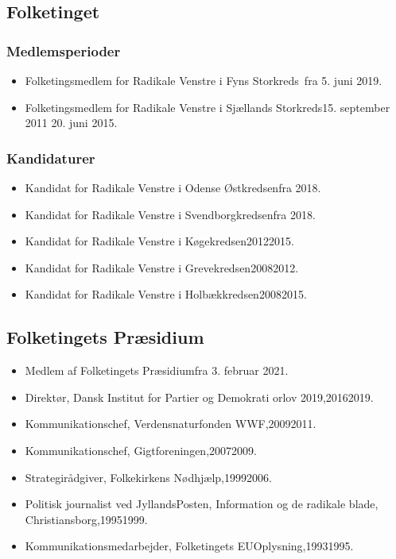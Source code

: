 \documentclass[11pt, a4paper]{awesome-cv}
\begin{document}
\begin{cvletter}
\subsection*{Folketinget}
\subsubsection*{Medlemsperioder}
\begin{itemize}
\item Folketingsmedlem for Radikale Venstre i Fyns Storkreds fra 5. juni 2019.
\item Folketingsmedlem for Radikale Venstre i Sjællands Storkreds15. september 2011  20. juni 2015.
\end{itemize}
\subsubsection*{Kandidaturer}
\begin{itemize}
\item Kandidat for Radikale Venstre i Odense Østkredsenfra 2018.
\item Kandidat for Radikale Venstre i Svendborgkredsenfra 2018.
\item Kandidat for Radikale Venstre i Køgekredsen20122015.
\item Kandidat for Radikale Venstre i Grevekredsen20082012.
\item Kandidat for Radikale Venstre i Holbækkredsen20082015.
\end{itemize}
\subsection*{Folketingets Præsidium}
\begin{itemize}
\item Medlem af Folketingets Præsidiumfra 3. februar 2021.
\end{itemize}
\begin{itemize}
\item Direktør, Dansk Institut for Partier og Demokrati orlov 2019,20162019.
\item Kommunikationschef, Verdensnaturfonden WWF,20092011.
\item Kommunikationschef, Gigtforeningen,20072009.
\item Strategirådgiver, Folkekirkens Nødhjælp,19992006.
\item Politisk journalist ved JyllandsPosten, Information og de radikale blade, Christiansborg,19951999.
\item Kommunikationsmedarbejder, Folketingets EUOplysning,19931995.
\end{itemize}
\end{cvletter}
\end{document}
